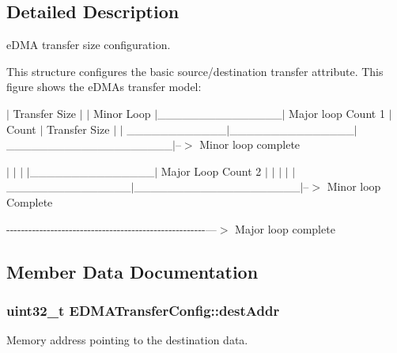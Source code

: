 \subsection{Detailed Description}
e\+D\+MA transfer size configuration. 

This structure configures the basic source/destination transfer attribute. This figure shows the e\+D\+MA\textquotesingle{}s transfer model\+: 

 $\vert$ Transfer Size $\vert$ $\vert$ Minor Loop $\vert$\+\_\+\+\_\+\+\_\+\+\_\+\+\_\+\+\_\+\+\_\+\+\_\+\+\_\+\+\_\+\+\_\+\+\_\+\+\_\+\+\_\+\+\_\+$\vert$ Major loop Count 1 $\vert$ Count $\vert$ Transfer Size $\vert$ $\vert$ \+\_\+\+\_\+\+\_\+\+\_\+\+\_\+\+\_\+\+\_\+\+\_\+\+\_\+\+\_\+\+\_\+\+\_\+$\vert$\+\_\+\+\_\+\+\_\+\+\_\+\+\_\+\+\_\+\+\_\+\+\_\+\+\_\+\+\_\+\+\_\+\+\_\+\+\_\+\+\_\+\+\_\+$\vert$\+\_\+\+\_\+\+\_\+\+\_\+\+\_\+\+\_\+\+\_\+\+\_\+\+\_\+\+\_\+\+\_\+\+\_\+\+\_\+\+\_\+\+\_\+\+\_\+\+\_\+\+\_\+\+\_\+\+\_\+$\vert$--$>$ Minor loop complete 

 $\vert$ $\vert$ $\vert$ $\vert$\+\_\+\+\_\+\+\_\+\+\_\+\+\_\+\+\_\+\+\_\+\+\_\+\+\_\+\+\_\+\+\_\+\+\_\+\+\_\+\+\_\+\+\_\+$\vert$ Major Loop Count 2 $\vert$ $\vert$ $\vert$ $\vert$ $\vert$\+\_\+\+\_\+\+\_\+\+\_\+\+\_\+\+\_\+\+\_\+\+\_\+\+\_\+\+\_\+\+\_\+\+\_\+\+\_\+\+\_\+\+\_\+$\vert$\+\_\+\+\_\+\+\_\+\+\_\+\+\_\+\+\_\+\+\_\+\+\_\+\+\_\+\+\_\+\+\_\+\+\_\+\+\_\+\+\_\+\+\_\+\+\_\+\+\_\+\+\_\+\+\_\+\+\_\+$\vert$--$>$ Minor loop Complete

-\/-\/-\/-\/-\/-\/-\/-\/-\/-\/-\/-\/-\/-\/-\/-\/-\/-\/-\/-\/-\/-\/-\/-\/-\/-\/-\/-\/-\/-\/-\/-\/-\/-\/-\/-\/-\/-\/-\/-\/-\/-\/-\/-\/-\/-\/-\/-\/-\/-\/-\/-\/-\/-\/---$>$ Major loop complete 

\subsection{Member Data Documentation}
\subsubsection[{\texorpdfstring{dest\+Addr}{destAddr}}]{\setlength{\rightskip}{0pt plus 5cm}uint32\+\_\+t E\+D\+M\+A\+Transfer\+Config\+::dest\+Addr}\hypertarget{structEDMATransferConfig_a78d3fa690232475c3a21b1c8b84761d2}{}\label{structEDMATransferConfig_a78d3fa690232475c3a21b1c8b84761d2}
Memory address pointing to the destination data. 

